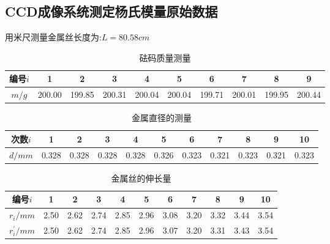 \documentclass[a4 paper,12pt]{article}
\begin{document}
\subsection{CCD成像系统测定杨氏模量原始数据}
\begin{center}
	用米尺测量金属丝长度为:$L=80.58cm$
\end{center}
\begin{table}[H]
	\caption{砝码质量测量}
	\label{砝码质量测量}
	\centering
	\begin{tabular}{c|*{9}{c}}
		\toprule[0.5mm]
		编号$i$&1&2&3&4&5&6&7&8&9\\
		\midrule
		$m/g$&200.00&199.85&200.31&200.04&200.04&199.71&200.01&199.95&200.44\\
		\bottomrule[0.5mm]
	\end{tabular}
\end{table}
\begin{table}[H]
	\caption{金属直径的测量}
	\label{金属直径的测量}
	\centering
	\begin{tabular}{c|*{10}{c}}
		\toprule[0.5mm]
		次数$i$&1&2&3&4&5&6&7&8&9&10\\
		\midrule
		$d/mm$&0.328&0.328&0.328&0.328&0.326&0.323&0.321&0.323&0.321&0.323\\
		\bottomrule[0.5mm]
	\end{tabular}
\end{table}
\begin{table}[H]
	\caption{金属丝的伸长量}
	\label{金属丝的伸长量}
	\centering
	\begin{tabular}{*{11}{c}}
		\toprule[0.5mm]
		编号$i$&1&2&3&4&5&6&7&8&9&10\\
		\midrule
		$r_{i}/mm$&2.50&2.62&2.74&2.85&2.96&3.08&3.20&3.32&3.44&3.54\\
		$r_{i}^{\prime}/mm$&2.50&2.62&2.74&2.85&2.96&3.07&3.20&3.31&3.43&3.54\\
		\bottomrule[0.5mm]
	\end{tabular}
\end{table}
\end{document}
